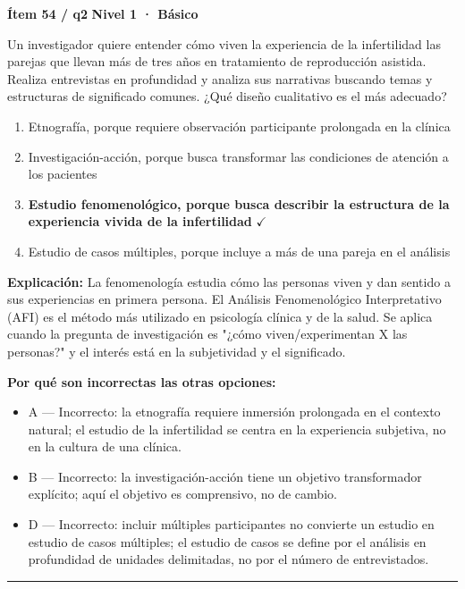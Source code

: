 \documentclass[12pt,a4paper]{article}
\begin{document}
\begin{mdframed}[backgroundcolor=fondogris,linecolor=azul,linewidth=1pt,innerleftmargin=10pt,innerrightmargin=10pt,innertopmargin=7pt,innerbottommargin=7pt]
\textbf{Ítem 54 / q2} \hfill {\small\bfseries\color{azul} Nivel 1 · Básico}
\end{mdframed}

Un investigador quiere entender cómo viven la experiencia de la infertilidad las parejas que llevan más de tres años en tratamiento de reproducción asistida. Realiza entrevistas en profundidad y analiza sus narrativas buscando temas y estructuras de significado comunes. ¿Qué diseño cualitativo es el más adecuado?

\begin{enumerate}
  \item[A.] Etnografía, porque requiere observación participante prolongada en la clínica
  \item[B.] Investigación-acción, porque busca transformar las condiciones de atención a los pacientes
  \item[\textbf{\color{verde}C.}] \textbf{\color{verde} Estudio fenomenológico, porque busca describir la estructura de la experiencia vivida de la infertilidad} \hfill $\checkmark$
  \item[D.] Estudio de casos múltiples, porque incluye a más de una pareja en el análisis
\end{enumerate}

\noindent\textbf{\color{azul}Explicación:} La fenomenología estudia cómo las personas viven y dan sentido a sus experiencias en primera persona. El Análisis Fenomenológico Interpretativo (AFI) es el método más utilizado en psicología clínica y de la salud. Se aplica cuando la pregunta de investigación es "¿cómo viven/experimentan X las personas?" y el interés está en la subjetividad y el significado.

\noindent\textbf{\color{gris}Por qué son incorrectas las otras opciones:}
\begin{itemize}
  \item {\small A — Incorrecto: la etnografía requiere inmersión prolongada en el contexto natural; el estudio de la infertilidad se centra en la experiencia subjetiva, no en la cultura de una clínica.}
  \item {\small B — Incorrecto: la investigación-acción tiene un objetivo transformador explícito; aquí el objetivo es comprensivo, no de cambio.}
  \item {\small D — Incorrecto: incluir múltiples participantes no convierte un estudio en estudio de casos múltiples; el estudio de casos se define por el análisis en profundidad de unidades delimitadas, no por el número de entrevistados.}
\end{itemize}
\vspace{8pt}\hrule\vspace{10pt}
\end{document}
